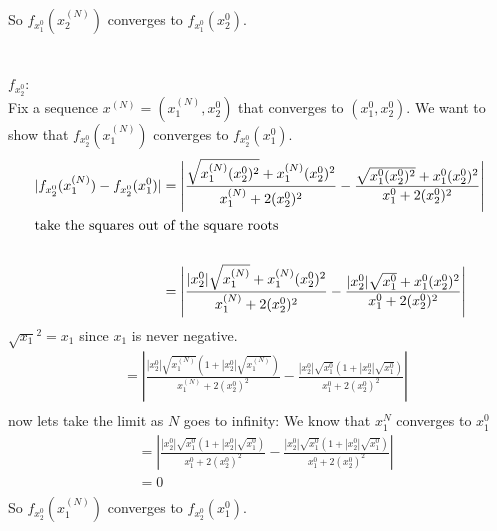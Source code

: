 \documentclass{article}
\begin{document}
So \(f_{x_1^0}(x_2^{(N)})\) converges to \(f_{x_1^0}(x_2^0)\). \\
\\
\\
\(f_{x_2^0}\): \\
Fix a sequence \(x^{(N)} = (x_1^{(N)}, x_2^0)\) that converges to \((x_1^0, x_2^0)\).
We want to show that \(f_{x_2^0}(x_1^{(N)})\) converges to \(f_{x_2^0}(x_1^0)\).
\begin{align*}
   |f_{x_2^0}(x_1^{(N)}) - f_{x_2^0}(x_1^0)| &= \left|\frac{\sqrt{x_1^{(N)} (x_2^0)^2} + x_1^{(N)} (x_2^0)^2}{x_1^{(N)} + 2(x_2^0)^2} - \frac{\sqrt{x_1^0 (x_2^0)^2} + x_1^0 (x_2^0)^2}{x_1^0 + 2(x_2^0)^2}\right| \\
   \shortintertext{take the squares out of the square roots} \\
   &= \left|\frac{|x_2^0| \sqrt{x_1^{(N)}} + x_1^{(N)} (x_2^0)^2}{x_1^{(N)} + 2(x_2^0)^2} - \frac{|x_2^0| \sqrt{x_1^0} + x_1^0 (x_2^0)^2}{x_1^0 + 2(x_2^0)^2}\right| \\
\end{align*}
\(\sqrt{x_1}^2 = x_1\) since \(x_1\) is never negative.
\begin{align*}
   &= \left|\frac{|x_2^0| \sqrt{x_1^{(N)}} (1 + |x_2^0| \sqrt{x_1^{(N)}})}{x_1^{(N)} + 2(x_2^0)^2} - \frac{|x_2^0| \sqrt{x_1^0} (1 + |x_2^0| \sqrt{x_1^0})}{x_1^0 + 2(x_2^0)^2}\right| \\
\end{align*}
now lets take the limit as \(N\) goes to infinity:
We know that \(x_1^{N}\) converges to \(x_1^0\)
\begin{align*}
   &= \left|\frac{|x_2^0| \sqrt{x_1^0} (1 + |x_2^0| \sqrt{x_1^0})}{x_1^0 + 2(x_2^0)^2} - \frac{|x_2^0| \sqrt{x_1^0} (1 + |x_2^0| \sqrt{x_1^0})}{x_1^0 + 2(x_2^0)^2}\right| \\
   &= 0 \\
\end{align*}
So \(f_{x_2^0}(x_1^{(N)})\) converges to \(f_{x_2^0}(x_1^0)\). \\
\end{document}

